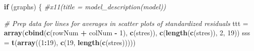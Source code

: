 \documentclass[]{article}
\newenvironment{Shaded}{\begin{snugshade}}{\end{snugshade}}
\newcommand{\CommentTok}[1]{\textcolor[rgb]{0.56,0.35,0.01}{\textit{#1}}}
\newcommand{\ControlFlowTok}[1]{\textcolor[rgb]{0.13,0.29,0.53}{\textbf{#1}}}
\newcommand{\DecValTok}[1]{\textcolor[rgb]{0.00,0.00,0.81}{#1}}
\newcommand{\KeywordTok}[1]{\textcolor[rgb]{0.13,0.29,0.53}{\textbf{#1}}}
\newcommand{\NormalTok}[1]{#1}
\newcommand{\OperatorTok}[1]{\textcolor[rgb]{0.81,0.36,0.00}{\textbf{#1}}}
\newcommand{\StringTok}[1]{\textcolor[rgb]{0.31,0.60,0.02}{#1}}
\begin{document}
\begin{Shaded}
\begin{Highlighting}[]
\ControlFlowTok{if}\NormalTok{ (graphs) \{}
  \CommentTok{#x11(title = model_description(model))}

  \CommentTok{# Prep data for lines for averages in scatter plots of standardized residuals}
\NormalTok{  ttt =}\StringTok{ }\KeywordTok{array}\NormalTok{(}\KeywordTok{cbind}\NormalTok{(}\KeywordTok{c}\NormalTok{(rowNum }\OperatorTok{+}\StringTok{ }\NormalTok{colNum }\OperatorTok{-}\StringTok{ }\DecValTok{1}\NormalTok{), }\KeywordTok{c}\NormalTok{(stres)), }
              \KeywordTok{c}\NormalTok{(}\KeywordTok{length}\NormalTok{(}\KeywordTok{c}\NormalTok{(stres)), }\DecValTok{2}\NormalTok{, }\DecValTok{19}\NormalTok{))}
\NormalTok{  sss =}\StringTok{ }\KeywordTok{t}\NormalTok{(}\KeywordTok{array}\NormalTok{((}\DecValTok{1}\OperatorTok{:}\DecValTok{19}\NormalTok{), }\KeywordTok{c}\NormalTok{(}\DecValTok{19}\NormalTok{, }\KeywordTok{length}\NormalTok{(}\KeywordTok{c}\NormalTok{(stres)))))}


\end{Highlighting}
\end{Shaded}
\end{document}
